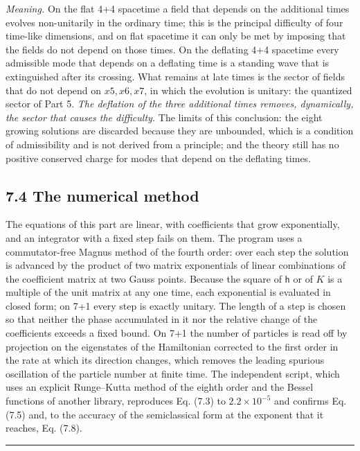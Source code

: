\documentclass[
  10pt,
]{article}
\begin{document}
\emph{Meaning.} On the flat 4+4 spacetime a field that depends on the
additional times evolves non-unitarily in the ordinary time; this is the
principal difficulty of four time-like dimensions, and on flat spacetime
it can only be met by imposing that the fields do not depend on those
times. On the deflating 4+4 spacetime every admissible mode that depends
on a deflating time is a standing wave that is extinguished after its
crossing. What remains at late times is the sector of fields that do not
depend on \(x5,x6,x7\), in which the evolution is unitary: the quantized
sector of Part 5. \emph{The deflation of the three additional times
removes, dynamically, the sector that causes the difficulty.} The limits
of this conclusion: the eight growing solutions are discarded because
they are unbounded, which is a condition of admissibility and is not
derived from a principle; and the theory still has no positive conserved
charge for modes that depend on the deflating times.

\hypertarget{the-numerical-method}{%
\subsection{7.4 The numerical method}\label{the-numerical-method}}

The equations of this part are linear, with coefficients that grow
exponentially, and an integrator with a fixed step fails on them. The
program uses a commutator-free Magnus method of the fourth order: over
each step the solution is advanced by the product of two matrix
exponentials of linear combinations of the coefficient matrix at two
Gauss points. Because the square of \(\mathsf h\) or of \(K\) is a
multiple of the unit matrix at any one time, each exponential is
evaluated in closed form; on 7+1 every step is exactly unitary. The
length of a step is chosen so that neither the phase accumulated in it
nor the relative change of the coefficients exceeds a fixed bound. On
7+1 the number of particles is read off by projection on the eigenstates
of the Hamiltonian corrected to the first order in the rate at which its
direction changes, which removes the leading spurious oscillation of the
particle number at finite time. The independent script, which uses an
explicit Runge--Kutta method of the eighth order and the Bessel
functions of another library, reproduces Eq. (7.3) to
\(2.2\times10^{-5}\) and confirms Eq. (7.5) and, to the accuracy of the
semiclassical form at the exponent that it reaches, Eq. (7.8).

\begin{center}\rule{0.5\linewidth}{0.5pt}\end{center}
\end{document}
